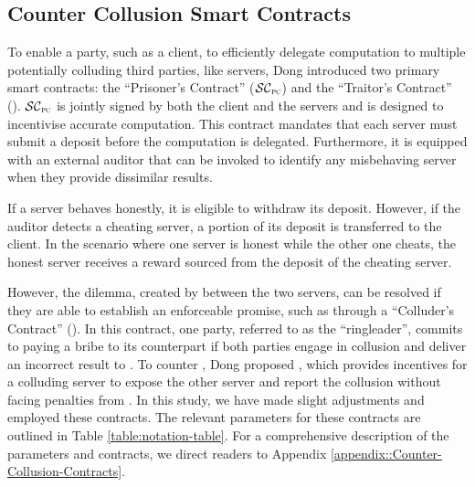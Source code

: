 \vspace{-4mm}

\subsection{Counter Collusion Smart Contracts}\label{Counter-Collusion-Smart-Contracts}
\vspace{-1mm}


To enable a party, such as a client, to efficiently delegate computation to multiple potentially colluding third parties, like servers, Dong   \et \cite{dong2017betrayal}  
introduced two primary smart contracts: the ``Prisoner's Contract'' ($\SCpc$) and the ``Traitor's Contract'' (\SCtc).  
%
$\SCpc$ is jointly signed by both the client and the servers and is designed to incentivise accurate computation. This contract mandates that each server must submit a deposit before the computation is delegated. Furthermore, it is equipped with an external auditor that can be invoked to identify any misbehaving server when they provide dissimilar results. 

If a server behaves honestly, it is eligible to withdraw its deposit. However, if the auditor detects a cheating server, a portion of its deposit is transferred to the client. In the scenario where one server is honest while the other one cheats, the honest server receives a reward sourced from the deposit of the cheating server.

However, the dilemma, created by \SCpc between the two servers, can be resolved if they are able to establish an enforceable promise, such as through a ``Colluder's Contract'' (\SCcc). In this contract,  one party, referred to as the ``ringleader'', commits to paying a bribe to its counterpart if both parties engage in collusion and deliver an incorrect result to \SCpc. 
%
To counter \SCcc, Dong   \et proposed \SCtc, which provides incentives for a colluding server to expose the other server and report the collusion without facing penalties from \SCpc. In this study, we have made slight adjustments and employed these contracts. The relevant parameters for these contracts are outlined in Table \ref{table:notation-table}. For a comprehensive description of the parameters and contracts, we direct readers to Appendix \ref{appendix::Counter-Collusion-Contracts}. 




